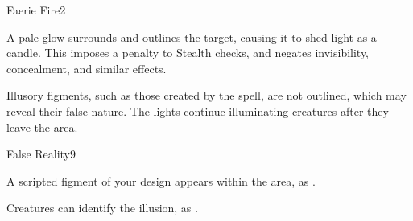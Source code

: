 \begin{spellsection}{Faerie Fire}{2}
    \begin{spellheader}
    \end{spellheader}
    \begin{spellcontent}
        \begin{spelltargetinginfo}
        \end{spelltargetinginfo}
        \begin{spelleffects}
            \spelleffect A pale glow surrounds and outlines the target, causing it to shed light as a candle. This imposes a  penalty to Stealth checks, and negates invisibility, concealment, and similar effects. 
            \spelldur \durshort \dismissable
        \end{spelleffects}
    \end{spellcontent}
    \begin{spellfooter}
        \spellnotes Illusory figments, such as those created by the  spell, are not outlined, which may reveal their false nature. The lights continue illuminating creatures after they leave the area.
        \miscastyou
    \end{spellfooter}
\end{spellsection}

\begin{spellsection}{False Reality}{9}
    \begin{spellheader}
    \end{spellheader}
    \begin{spellcontent}
        \begin{spelltargetinginfo}
        \end{spelltargetinginfo}
        \begin{spelleffects}
            \spelleffect A scripted figment of your design appears within the area, as .
            \spelldur \durlong \dismissable
        \end{spelleffects}
    \end{spellcontent}
    \begin{spellfooter}
        \spellnotes Creatures can identify the illusion, as .
        \miscastexplode
    \end{spellfooter}
\end{spellsection}

